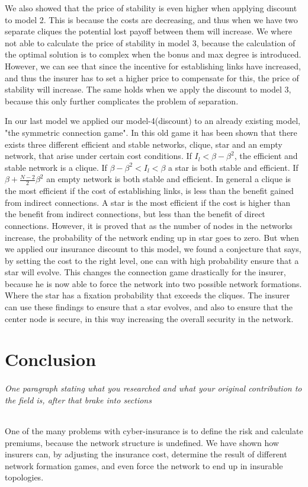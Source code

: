 We also showed that the price of stability is even higher when applying discount to model 2. This is because the costs are decreasing, and thus when we have two separate cliques the potential lost payoff between them will increase.
We where not able to calculate the price of stability in model 3, because the calculation of the optimal solution is to complex when the bonus and max degree is introduced. However, we can see that since the incentive for establishing links have increased, and thus the insurer has to set a higher price to compensate for this, the price of stability will increase. The same holds when we apply the discount to model 3, because this only further complicates the problem of separation.  

In our last model we applied our model-4(discount) to an already existing model, "the symmetric connection game". In this old game it has been shown that there exists three different efficient and stable networks, clique, star and an empty network, that arise under certain cost conditions. If $I_{l}<\beta-\beta^{2}$, the efficient and stable network is a clique. If $\beta-\beta^{2}<I_{l}<\beta$ a star is both stable and efficient. If $\beta+\frac{N-2}{2}\beta^{2}$ an empty network is both stable and efficient. In general a clique is the most efficient if the cost of establishing links, is less than the benefit gained from indirect connections. A star is the most efficient if the cost is higher than the benefit from indirect connections, but less than the benefit of direct connections. 
However, it is proved that as the number of nodes in the networks increase, the probability of the network ending up in star goes to zero. But when we applied our insurance discount to this model, we found a conjecture that says, by setting the cost to the right level, one can with high probability ensure that a star will evolve. This changes the connection game drastically for the insurer, because he is now able to force the network into two possible network formations. Where the star has a fixation probability that exceeds the cliques. The insurer can use these findings to ensure that a star evolves, and also to ensure that the center node is secure, in this way increasing the overall security in the network. 

\chapter{Conclusion}
\subparagraph{One paragraph stating what you researched and what your original contribution to the field is, after that brake into sections}
One of the many problems with cyber-insurance is to define the risk and calculate premiums, because the network structure is undefined. We have shown how insurers can, by adjusting the insurance cost, determine the result of different network formation games, and even force the network to end up in insurable topologies.  
